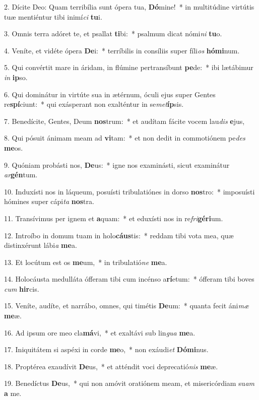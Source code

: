 2. Dícite Deo: Quam terribília sunt ópera tua, \textbf{Dó}mine!~*  in multitúdine virtútis tuæ mentiéntur tibi inimí\textit{ci} \textbf{tu}i.\

3. Omnis terra adóret te, et psallat \textbf{ti}bi:~*  psalmum dicat nómi\textit{ni} \textbf{tu}o.\

4. Veníte, et vidéte ópera \textbf{De}i:~*  terríbilis in consíliis super fíli\textit{os} \textbf{hó}\textbf{mi}num.\

5. Qui convértit mare in áridam, in flúmine pertransíbunt \textbf{pe}de:~*  ibi lætábimur \textit{in} \textbf{ip}so.\

6. Qui dominátur in virtúte sua in ætérnum, óculi ejus super Gentes re\textbf{spí}ciunt:~*  qui exásperant non exalténtur in se\textit{met}\textbf{íp}sis.\

7. Benedícite, Gentes, Deum \textbf{nos}trum:~*  et audítam fácite vocem lau\textit{dis} \textbf{e}jus,\

8. Qui pósuit ánimam meam ad \textbf{vi}tam:~*  et non dedit in commotiónem pe\textit{des} \textbf{me}os.\

9. Quóniam probásti nos, \textbf{De}us:~*  igne nos examinásti, sicut examinátur \textit{ar}\textbf{gén}tum.\

10. Induxísti nos in láqueum, posuísti tribulatiónes in dorso \textbf{nos}tro:~*  imposuísti hómines super cápi\textit{ta} \textbf{nos}tra.\

11. Transívimus per ignem et \textbf{a}quam:~*  et eduxísti nos in re\textit{fri}\textbf{gé}\textbf{ri}um.\

12. Introíbo in domum tuam in holo\textbf{cáus}tis:~*  reddam tibi vota mea, quæ distinxérunt lábi\textit{a} \textbf{me}a.\

13. Et locútum est os \textbf{me}um,~*  in tribulatió\textit{ne} \textbf{me}a.\

14. Holocáusta medulláta ófferam tibi cum incénso a\textbf{rí}etum:~*  ófferam tibi boves \textit{cum} \textbf{hir}cis.\

15. Veníte, audíte, et narrábo, omnes, qui timétis \textbf{De}um:~*  quanta fecit áni\textit{mæ} \textbf{me}æ.\

16. Ad ipsum ore meo cla\textbf{má}vi,~*  et exaltávi sub lin\textit{gua} \textbf{me}a.\

17. Iniquitátem si aspéxi in corde \textbf{me}o,~*  non exáudi\textit{et} \textbf{Dó}\textbf{mi}nus.\

18. Proptérea exaudívit \textbf{De}us,~*  et atténdit voci deprecatió\textit{nis} \textbf{me}æ.\

19. Benedíctus \textbf{De}us,~*  qui non amóvit oratiónem meam, et misericórdiam su\textit{am} \textbf{a} me.\

